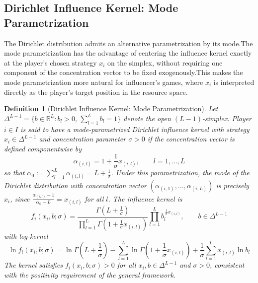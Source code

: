 \documentclass{article}
\newtheorem{definition}{Definition}
\begin{document}
    \subsection{Dirichlet Influence Kernel: Mode Parametrization}\label{subsec:SI_dirichlet_mode}

    The Dirichlet distribution admits an alternative parametrization by its mode.The mode parametrization has the advantage of centering the influence kernel exactly at the player's chosen strategy $x_i$ on the simplex, without requiring one component of the concentration vector to be fixed exogenously.This makes the mode parametrization more natural for influencer's games, where $x_i$ is interpreted directly as the player's target position in the resource space.

    \begin{definition}[Dirichlet Influence Kernel: Mode Parametrization]
    \label{def:SI_dirichlet_mode_kernel}
        Let $\Delta^{L-1} = \{b \in \mathbb{R}^L : b_l > 0,\, \sum_{l=1}^L b_l = 1\}$ denote the open $(L-1)$-simplex.
        Player $i \in I$ is said to have a mode-parametrized Dirichlet influence kernel with strategy $x_i \in \Delta^{L-1}$ and concentration parameter $\sigma > 0$ if the concentration vector is defined componentwise by
        \begin{equation}
            \label{eq:SI_dirichlet_mode_alpha}
            \alpha_{(i,l)} = 1 + \frac{1}{\sigma} x_{(i,l)}, \qquad l = 1,\ldots,L
        \end{equation}
        so that $\alpha_0 := \sum_{l=1}^L \alpha_{(i,l)} = L + \frac{1}{\sigma}$.
        Under this parametrization, the mode of the Dirichlet distribution with concentration vector $(\alpha_{(i,1)},\ldots,\alpha_{(i,L)})$ is precisely $x_i$, since $\frac{\alpha_{(i,l)}-1}{\alpha_0 - L} = x_{(i,l)}$ for all $l$.
        The influence kernel is
        \begin{equation}
            \label{eq:SI_dirichlet_mode_kernel}
            f_i(x_i, b;\sigma) = \frac{\Gamma(L+\frac{1}{\sigma})}{\prod_{l=1}^L \Gamma(1+\frac{1}{\sigma} x_{(i,l)})}
            \prod_{l=1}^L b_l^{\,\frac{1}{\sigma} x_{(i,l)}}, \qquad b \in \Delta^{L-1}
        \end{equation}
        with log-kernel
        \begin{equation}
            \label{eq:SI_dirichlet_mode_log_kernel}
            \ln f_i(x_i, b;\sigma)
            = \ln\Gamma(L+\frac{1}{\sigma})
            - \sum_{l=1}^L \ln\Gamma(1+\frac{1}{\sigma} x_{(i,l)})
            + \frac{1}{\sigma}\sum_{l=1}^L x_{(i,l)}\ln b_l
        \end{equation}
        The kernel satisfies $f_i(x_i,b;\sigma) > 0$ for all $x_i, b \in \Delta^{L-1}$ and $\sigma > 0$, consistent with the positivity requirement of the general framework.
    \end{definition}
\end{document}
